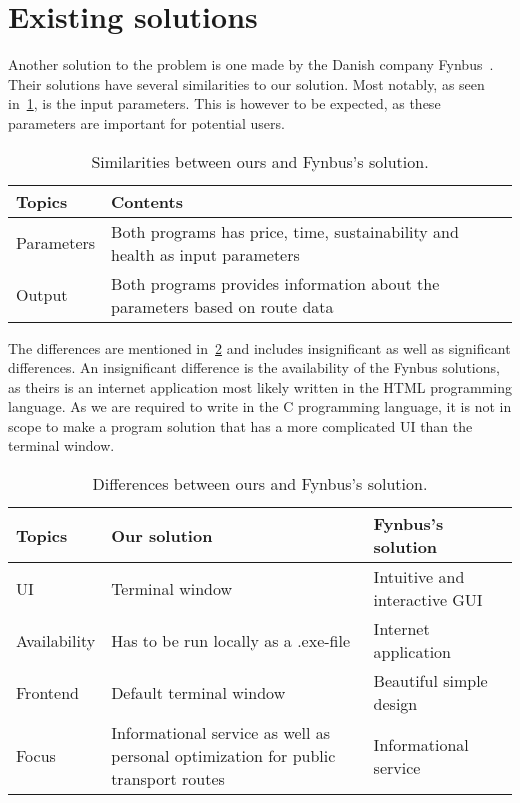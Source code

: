 \section{Existing solutions}\label{existing-solutions}

Another solution to the problem is one made by the Danish company Fynbus~\cite{fynbus2023}.
Their solutions have several similarities to our solution.
Most notably, as seen in~\ref{tab:similarities-between-ours-and-fynbus's-solution}, is the input parameters.
This is however to be expected, as these parameters are important for potential users.

\begin{table}[ht]
    \centering
    \begin{tabular}{|l|p{5cm}|p{5cm}|}
        \hline
        \textbf{Topics} & \textbf{Contents} \\
        \hline
        Parameters & Both programs has price, time, sustainability and health as input parameters \\
        \hline
        Output & Both programs provides information about the parameters based on route data \\
        \hline
    \end{tabular}
    \caption{Similarities between ours and Fynbus's solution.}
    \label{tab:similarities-between-ours-and-fynbus's-solution}
\end{table}

The differences are mentioned in~\ref{tab:differences-between-ours-and-fynbus's-solution} and includes insignificant as
well as significant differences.
An insignificant difference is the availability of the Fynbus solutions, as theirs is an internet application most
likely written in the HTML programming language.
As we are required to write in the C programming language, it is not in scope to make a program solution that has a more
complicated UI than the terminal window.

\begin{table}[ht]
    \centering
    \begin{tabular}{|l|p{5cm}|p{5cm}|}
        \hline
        \textbf{Topics} & \textbf{Our solution} & \textbf{Fynbus's solution} \\
        \hline
        UI & Terminal window & Intuitive and interactive GUI \\
        \hline
        Availability & Has to be run locally as a .exe-file & Internet application \\
        \hline
        Frontend & Default terminal window & Beautiful simple design \\
        \hline
        Focus & Informational service as well as personal optimization for public transport routes & Informational service \\
        \hline
    \end{tabular}
    \caption{Differences between ours and Fynbus's solution.}
    \label{tab:differences-between-ours-and-fynbus's-solution}
\end{table}

